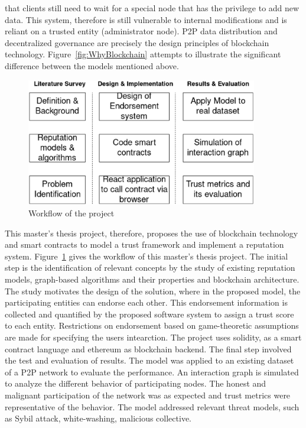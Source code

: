 that clients still need to wait for a special node that has the privilege to
add new data. This system, therefore is still vulnerable to internal
modifications and is reliant on a trusted entity (administrator node). P2P data
distribution and decentralized governance are precisely the design principles
of blockchain technology. Figure~\ref{fig:WhyBlockchain} attempts to
illustrate the significant difference between the models mentioned above.\\
\begin{figure}
	\begin{center}
		\includegraphics[width=0.9\textwidth]{Images/workflow.eps}
		\caption{Workflow of the project}
		\label{fig:thesisSteps}
	\end{center}
\end{figure}
This master's thesis project, therefore, proposes the use of blockchain technology and
smart contracts to model a trust framework and implement a reputation system.
Figure~\ref{fig:thesisSteps} gives the workflow of this master's thesis project. The initial
step is the identification of relevant concepts by the study of existing
reputation models, graph-based algorithms and their properties and blockchain
architecture. The study motivates the design of the solution, where in the proposed model, the participating entities can endorse each other. This endorsement
information is collected and quantified by the proposed software system to
assign a trust score to each entity. Restrictions on endorsement based on
game-theoretic assumptions are made for specifying the users intearction. The
project uses solidity, as a smart contract language and ethereum as blockchain
backend. The final step involved the test and evaluation of results. The model
was applied to an existing dataset of a P2P network to evaluate the
performance. An interaction graph is simulated to analyze the different
behavior of participating nodes. The honest and malignant participation of the
network was as expected and trust metrics were representative of the behavior.
The model addressed relevant threat models, such as Sybil attack,
white-washing, malicious collective. 


